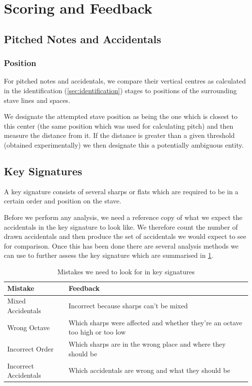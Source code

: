 \section{Scoring and Feedback}
\label{sec:scoring}

\subsection{Pitched Notes and Accidentals}
\label{sec:pitched-notes-accidentals}

\subsubsection{Position}\label{sec:scoring-position}

For pitched notes and accidentals, we compare their vertical centres as calculated in the identification (\cref{sec:identification}) stages to positions of the surrounding stave lines and spaces.

We designate the attempted stave position as being the one which is closest to this center (the same position which was used for calculating pitch) and then measure the distance from it. If the distance is greater than a given threshold (obtained experimentally) we then designate this a potentially ambiguous entity.

\subsection{Key Signatures}

A key signature consists of several sharps or flats which are required to be in a certain order and position on the stave.

Before we perform any analysis, we need a reference copy of what we expect the accidentals in the key signature to look like. We therefore count the number of drawn accidentals and then produce the set of accidentals we would expect to see for comparison. Once this has been done there are several analysis methods we can use to further assess the key signature which are summarised in \cref{table:key-signature-errors}.

\begin{table}[H]
    \renewcommand{\arraystretch}{1.6}
    \begin{tabularx}{\textwidth}{ lX }
        \toprule
        Mistake & Feedback \\
        \midrule
        Mixed Accidentals & Incorrect because sharps can't be mixed \\
        Wrong Octave & Which sharps were affected and whether they're an octave too high or too low \\
        Incorrect Order & Which sharps are in the wrong place and where they should be \\
        Incorrect Accidentals & Which accidentals are wrong and what they should be \\
        \bottomrule
    \end{tabularx}

    \caption{Mistakes we need to look for in key signatures}
    \label{table:key-signature-errors}
\end{table}

